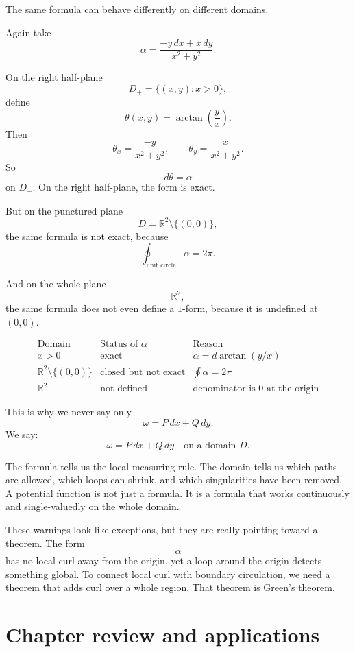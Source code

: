 The same formula can behave differently on different domains.

Again take
\[
    \alpha=\frac{-y\,dx+x\,dy}{x^2+y^2}.
\]

On the right half-plane
\[
    D_+=\{(x,y):x>0\},
\]
define
\[
    \theta(x,y)=\arctan\left(\frac{y}{x}\right).
\]
Then
\[
    \theta_x=
    \frac{-y}{x^2+y^2},
    \qquad
    \theta_y=
    \frac{x}{x^2+y^2}.
\]
So
\[
\boxed{
    d\theta=\alpha
}
\]
on \(D_+\).  On the right half-plane, the form is exact.

But on the punctured plane
\[
    D=\mathbb R^2\setminus\{(0,0)\},
\]
the same formula is not exact, because
\[
    \oint_{\text{unit circle}}\alpha=2\pi.
\]

And on the whole plane
\[
    \mathbb R^2,
\]
the same formula does not even define a \(1\)-form, because it is undefined at
\((0,0)\).

\[
\begin{array}{c|c|c}
\text{Domain} & \text{Status of }\alpha & \text{Reason} \\ \hline
x>0 & \text{exact} & \alpha=d\arctan(y/x)\\[1mm]
\mathbb R^2\setminus\{(0,0)\} & \text{closed but not exact} &
\displaystyle \oint \alpha=2\pi\\[2mm]
\mathbb R^2 & \text{not defined} & \text{denominator is }0\text{ at the origin}
\end{array}
\]

This is why we never say only
\[
    \omega=P\,dx+Q\,dy.
\]
We say:
\[
    \omega=P\,dx+Q\,dy
    \quad\text{on a domain }D.
\]

The formula tells us the local measuring rule.  The domain tells us which paths are
allowed, which loops can shrink, and which singularities have been removed.  A
potential function is not just a formula.  It is a formula that works continuously and
single-valuedly on the whole domain.

These warnings look like exceptions, but they are really pointing toward a theorem.
The form
\[
    \alpha
\]
has no local curl away from the origin, yet a loop around the origin detects something
global.  To connect local curl with boundary circulation, we need a theorem that adds
curl over a whole region.  That theorem is Green's theorem.

\section{Chapter review and applications}
\label{sec:13.8}

